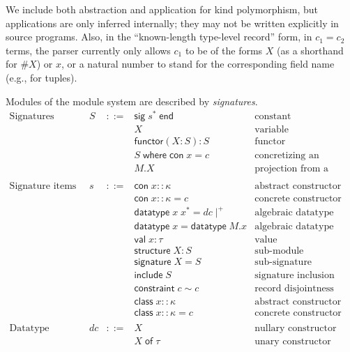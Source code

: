 \documentclass{article}
\newcommand{\mt}[1]{\mathsf{#1}}
\begin{document}
We include both abstraction and application for kind polymorphism, but applications are only inferred internally; they may not be written explicitly in source programs.  Also, in the ``known-length type-level record'' form, in $c_1 = c_2$ terms, the parser currently only allows $c_1$ to be of the forms $X$ (as a shorthand for $\#X$) or $x$, or a natural number to stand for the corresponding field name (e.g., for tuples).

Modules of the module system are described by \emph{signatures}.
$$\begin{array}{rrcll}
  \textrm{Signatures} & S &::=& \mt{sig} \; s^* \; \mt{end} & \textrm{constant} \\
  &&& X & \textrm{variable} \\
  &&& \mt{functor}(X : S) : S & \textrm{functor} \\
  &&& S \; \mt{where} \; \mt{con} \; x = c & \textrm{concretizing an abstract constructor} \\
  &&& M.X & \textrm{projection from a module} \\
  \\
  \textrm{Signature items} & s &::=& \mt{con} \; x :: \kappa & \textrm{abstract constructor} \\
  &&& \mt{con} \; x :: \kappa = c & \textrm{concrete constructor} \\
  &&& \mt{datatype} \; x \; x^* = dc\mid^+ & \textrm{algebraic datatype definition} \\
  &&& \mt{datatype} \; x = \mt{datatype} \; M.x & \textrm{algebraic datatype import} \\
  &&& \mt{val} \; x : \tau & \textrm{value} \\
  &&& \mt{structure} \; X : S & \textrm{sub-module} \\
  &&& \mt{signature} \; X = S & \textrm{sub-signature} \\
  &&& \mt{include} \; S & \textrm{signature inclusion} \\
  &&& \mt{constraint} \; c \sim c & \textrm{record disjointness constraint} \\
  &&& \mt{class} \; x :: \kappa & \textrm{abstract constructor class} \\
  &&& \mt{class} \; x :: \kappa = c & \textrm{concrete constructor class} \\
  \\
  \textrm{Datatype constructors} & dc &::=& X & \textrm{nullary constructor} \\
  &&& X \; \mt{of} \; \tau & \textrm{unary constructor} \\
\end{array}$$
\end{document}
